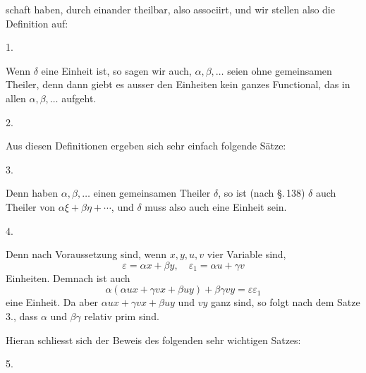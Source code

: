 schaft haben, durch einander theilbar, also associirt, und wir stellen also die Definition auf:

1. 

Wenn $\delta$ eine Einheit ist, so sagen wir auch, $\alpha, \beta, \dots$ seien ohne gemeinsamen Theiler, denn dann giebt es ausser den Einheiten kein ganzes Functional, das in allen $\alpha, \beta, \dots$ aufgeht.

2. 

Aus diesen Definitionen ergeben sich sehr einfach folgende Sätze:

3. 

Denn haben $\alpha, \beta, \dots$ einen gemeinsamen Theiler $\delta$, so ist (nach \S.\,138) $\delta$ auch Theiler von $\alpha \xi + \beta \eta + \cdots$, und $\delta$ muss also auch eine Einheit sein.

4. 

Denn nach Voraussetzung sind, wenn $x, y, u, v$ vier Variable sind,
\[ \varepsilon = \alpha x + \beta y, \quad \varepsilon_1 = \alpha u + \gamma v \]
Einheiten. Demnach ist auch
\[ \alpha (\alpha u x + \gamma v x + \beta u y) + \beta \gamma v y = \varepsilon \varepsilon_1 \]
eine Einheit. Da aber $\alpha u x + \gamma v x + \beta u y$ und $v y$ ganz sind, so folgt nach dem Satze 3., dass $\alpha$ und $\beta \gamma$ relativ prim sind.

Hieran schliesst sich der Beweis des folgenden sehr wichtigen Satzes:

5. 
